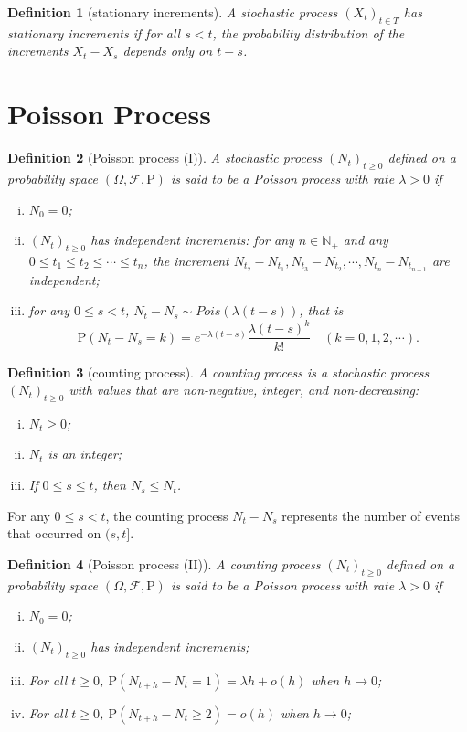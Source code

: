 \documentclass{article}
\newtheorem{definition}{Definition}[section]
\theoremstyle{nonumberplain}
\begin{document}
\begin{definition}[stationary increments]
	A stochastic process $(X_t)_{t\in T}$ has \emph{stationary increments} if for all $s<t$, the probability distribution of the increments $X_{t}-X_{s}$ depends only on $t-s$.
\end{definition}

\section{Poisson Process}
\begin{definition}[Poisson process (I)]
	A stochastic process $(N_t)_{t\ge0}$ defined on a probability space $(\Omega,\mathcal{F},\mathrm{P})$ is said to be a \emph{Poisson process} with rate $\lambda>0$ if
	\begin{enumerate}[(i)]
		\item $N_0=0$;
		\item \hypertarget{Definition 2.1(ii)}{} $(N_t)_{t\ge0}$ has independent increments: for any $n\in \mathbb{N}_+$ and any $0\le t_1\le t_2 \le\cdots\le t_n$, the increment $N_{t_2}-N_{t_1},N_{t_3}-N_{t_2},\cdots,N_{t_n}-N_{t_{n-1}}$ are independent;
		\item \hypertarget{Definition 2.1(iii)}{}for any $0\le s < t$, $N_t-N_s\sim Pois(\lambda(t-s))$, that is 
		\[
		\mathrm{P}(N_t-N_s=k)=e^{-\lambda(t-s)}\dfrac{\lambda(t-s)^k}{k!}\quad(k=0,1,2,\cdots).
		\]
	\end{enumerate}	
\end{definition}

\begin{definition}[counting process]
	A \emph{counting process} is a stochastic process $(N_t)_{t\ge 0}$ with values that are non-negative, integer, and non-decreasing:
	\begin{enumerate}[(i)]
		\item $N_t\ge0$;
		\item $N_t$ is an integer;
		\item If $0\le s\le t$, then $N_s \le N_t$.
	\end{enumerate}	
		
\end{definition}
For any $0\le s<t$, the counting process $N_t-N_s$ represents the number of events that occurred on $(s,t]$.  


\begin{definition}[Poisson process (II)]
	A counting process $(N_t)_{t\ge0}$ defined on a probability space $(\Omega,\mathcal{F},\mathrm{P})$ is said to be a \emph{Poisson process} with rate $\lambda>0$ if
	\begin{enumerate}[(i)]
		\item $N_0=0$;
		\item $(N_t)_{t\ge0}$ has independent increments;
		\item \hypertarget{Definition 2.3(iii)}{}For all $t\ge0$, $\mathrm{P}(N_{t+h}-N_t=1)=\lambda h+o(h)$ when $h\to0$;
		\item \hypertarget{Definition 2.3(iv)}{}For all $t\ge0$, $\mathrm{P}(N_{t+h}-N_t\ge2)=o(h)$ when $h\to0$;
	\end{enumerate}	
\end{definition}
\end{document}
